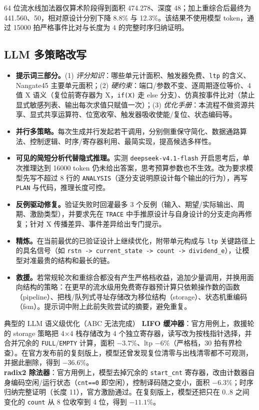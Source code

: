 \documentclass[UTF8,a4paper,zihao=5]{ctexart}
\newcommand{\code}[1]{\texttt{#1}}
\begin{document}
64 位流水线加法器仅算术阶段得到面积 474.278、深度 48；加上重综合后最终为 441.560、50，相对原设计分别下降 8.8\% 与 12.3\%。该结果不使用模型 token，通过 15000 拍严格事件比对与长度为 4 的完整时序归纳证明。

\subsection{LLM 多策略改写}
\begin{itemize}
\item \textbf{提示词三部分。}(1) \emph{评分知识}：哪些单元计面积、触发器免费、\code{ltp} 的含义、Nangate45 主要单元面积；(2) \emph{硬约束}：端口/参数不变、逐周期逐位等价、4 值 X 语义（复位前寄存器为 X，\code{if(X)} 走 else 分支）、仿真按事件比对（禁止显式敏感列表、输出每次求值只赋值一次）；(3) \emph{优化手册}：本流程不做资源共享、显式共享运算符、位宽收窄、触发器吸收使能/复位、状态编码等。
\item \textbf{并行多策略。}每次生成并行发起若干调用，分别侧重保守简化、数据通路算法、控制逻辑、时序/寄存器利用、最简实现，提高候选多样性。
\item \textbf{可见的简短分析代替隐式推理。}实测 \code{deepseek-v4.1-flash} 开启思考后，单次推理达到 16000 token 仍未给出答案，思考预算参数也不生效。改为要求模型先写不超过 8 行的 \code{ANALYSIS}（逐分支说明原设计每个输出的行为），再写 \code{PLAN} 与代码，推理长度可控。
\item \textbf{反例驱动修复。}验证失败时回灌最多 3 个反例（输入、期望/实际输出、周期、激励类型），并要求先在 \code{TRACE} 中手推原设计与自身设计的分支走向再修复；针对 X 传播差异、事件差异给出专门提示。
\item \textbf{精炼。}在当前最优的已验证设计上继续优化，附带单元构成与 \code{ltp} 关键路径上的具名信号（如 \code{rstn -> current\_state -> count -> dividend\_e}），让模型对准最贵的结构和最长的链。
\item \textbf{救援。}若常规轮次和重综合都没有产生严格档收益，追加少量调用，并换用面向结构的策略：在更早的流水级用免费寄存器预计算只依赖操作数的函数（pipeline）、把栈/队列式寻址存储改为移位结构（storage）、状态机重编码（fsm）。提示词中附上此前失败尝试的摘要，避免重复。
\end{itemize}

\begin{keybox}{典型的 LLM 语义级优化（ABC 无法完成）}
\textbf{LIFO 缓冲器}：官方用例上，救援轮的 storage 策略把 4×4 栈存储改为 4 个独立寄存器，读写改为按栈指针选择，并合并冗余的 \code{FULL}/\code{EMPTY} 计算，面积 $-3.7\%$、ltp $-6\%$（严格档，30 拍有界检查）。在官方发布前的复刻版上，模型还曾发现复位清零与出栈清零都不可观测，并据此删除，得到 $-36.6\%$。\\[2pt]
\textbf{radix2 除法器}：官方用例上，模型去掉冗余的 \code{start\_cnt} 寄存器，改由计数器自身编码空闲/运行状态（\code{cnt==0} 即空闲），控制译码随之变小，面积 $-6.3\%$；时序归纳完整证明（长度 11），官方激励通过。在复刻版上，模型还把只在 0..8 之间变化的 \code{count} 从 8 位收窄到 4 位，得到 $-11.1\%$。
\end{keybox}
\end{document}

